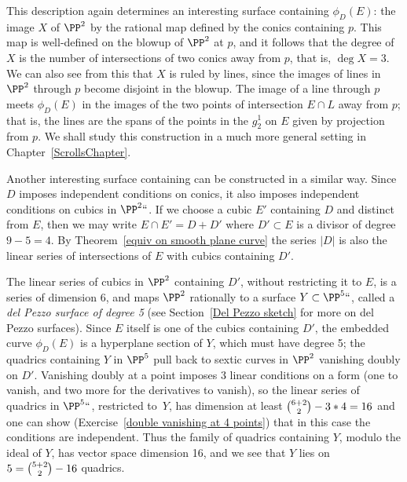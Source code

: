 This description again determines an interesting surface containing $\phi_D(E)$: the image $X$ of $\PP^2$ by the rational map
defined by the conics containing $p$. This map is well-defined on the 
blowup
%
of $\PP^2$ at $p$, and it follows that the degree of $X$ is the number
of intersections of two conics away from $p$, that is, $\deg X = 3$.
We can also see from this that $X$ is ruled by lines, since the images
of lines in $\PP^2$ through $p$ become disjoint in the blowup. The
image of a line through $p$ meets 
$\phi_D(E)$ in the images of the two points of intersection $E\cap L$ away from $p$; that is, the lines are the spans of the
points in the $g^1_2$ on $E$ given by projection from $p$. We shall study this construction in a much more general setting
in Chapter~\ref{ScrollsChapter}.

Another interesting surface containing 
can be constructed in a similar way.
Since $D$ imposes independent conditions on conics, it also imposes independent conditions on cubics in $\PP^2` `$.
If we choose a cubic $E'$ containing $D$ and distinct from $E$, then we may write $E\cap E' = D +D'$ where $D'\subset E$
is a divisor of degree $9-5 = 4$.  By Theorem~\ref{equiv on smooth plane curve} 
the series $|D|$ is also the linear series of intersections of $E$ with cubics containing $D'$. 

The linear series of cubics in $\PP^2$ containing $D'$, without restricting it to $E$, is a series of dimension $6$,
and maps $\PP^2$ rationally to a surface $Y\subset \PP^5` `$, called a 
%
\emph{del Pezzo surface of degree 5} (see Section~\ref{Del Pezzo sketch}
for more on del Pezzo surfaces). Since $E$ itself is one of the cubics containing $D'$, the embedded curve $\phi_D(E)$ is a hyperplane section of $Y$, which must have degree 5;  the quadrics containing $Y$ in $\PP^5$ pull back to 
sextic curves in $\PP^2$ vanishing doubly on $D'$. Vanishing doubly at a point imposes
3 linear conditions on a form (one to vanish, and two more for the derivatives to vanish), so the linear series of quadrics in $\PP^5` `$,
restricted to~$Y$, has dimension at least
$
\tbinom{6+2}{2} - 3*4 = 16
$
and one can show (Exercise~\ref{double vanishing at 4 points}) that in this case the conditions are independent.
Thus the family of quadrics containing $Y$, modulo the ideal of $Y$, has vector space dimension 16, and we see that
$Y$ lies on $5 = \tbinom{5+2}{2} - 16$ quadrics.


